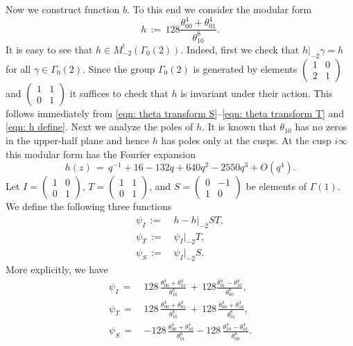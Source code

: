 \documentclass{scrartcl}
\begin{document}
Now we construct function $b$. To this end we consider the modular form
\begin{equation}\label{eqn: h define}
  h\,:=\,128 \frac{\theta_{00}^4+\theta_{01}^4}{\theta_{10}^8}.
\end{equation}
It is easy to see that $h\in M^!_{-2}(\Gamma_0(2))$. Indeed, first we check that $h|_{-2}\gamma=h$
for all $\gamma\in\Gamma_0(2)$. Since the group $\Gamma_0(2)$ is generated by elements
$\left(\begin{smallmatrix}1&0\\2&1\end{smallmatrix}\right)$ and $\left(\begin{smallmatrix}1&1\\0&1\end{smallmatrix}\right)$
it suffices to check that $h$ is invariant under their action. This follows immediately
from \eqref{eqn: theta transform S}--\eqref{eqn: theta transform T} and \eqref{eqn: h define}. Next we analyze the poles of $h$.
It is known \cite[Chapter~I Lemma~4.1]{Mumford} that $\theta_{10}$ has no zeros in the upper-half plane and hence $h$ has poles only at the cusps.
At the cusp $i\infty$ this modular form has the Fourier expansion
\begin{equation*}
h(z)\,=\,q^{-1} + 16 - 132 q + 640 q^2 - 2550 q^3+O(q^4).
\end{equation*}
Let $I=\left(\begin{smallmatrix}1&0\\0&1\end{smallmatrix}\right)$,
$T=\left(\begin{smallmatrix}1&1\\0&1\end{smallmatrix}\right)$, and
$S=\left(\begin{smallmatrix}0&-1\\1&0\end{smallmatrix}\right)$ be elements of $\Gamma(1)$.
We define the following three functions
\begin{align}
  \psi_I\,:=\,&h-h|_{-2}ST,\label{eqn: psi I define}\\
  \psi_T\,:=\,&\psi_I|_{-2}T ,\label{eqn: psi T define}\\
  \psi_S\,:=\,&\psi_I|_{-2}S. \label{eqn: psi S define}
\end{align}
More explicitly, we have
\begin{align}
\psi_I\,=\,&128\,\frac{\theta_{00}^4+\theta_{01}^4}{\theta_{10}^8}\,+\,128
              \frac{\theta_{01}^4-\theta_{10}^4}{\theta_{00}^8},\label{eqn: psi I explicit}\\
\psi_T\,=\,&128\,\frac{\theta_{00}^4+\theta_{01}^4}{\theta_{10}^8}\,+
              \,128\,\frac{\theta_{00}^4+\theta_{10}^4}{\theta_{01}^8},\label{eqn: psi T explicit}\\
\psi_S\,=\,&-128\,\frac{\theta_{00}^4+\theta_{10}^4}{\theta_{01}^8}-128\,
              \frac{\theta_{10}^4-\theta_{01}^4}{\theta_{00}^8}.\label{eqn: psi S explicit}
\end{align}
\end{document}

